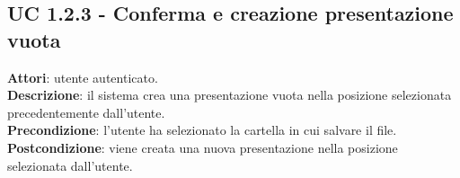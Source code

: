 \subsection{UC 1.2.3 - Conferma e creazione presentazione vuota}{
	\label{uc1.2.3}
	\textbf{Attori}: utente autenticato.	\\
	\textbf{Descrizione}: il sistema crea una presentazione vuota nella posizione selezionata precedentemente dall'utente.	\\
	\textbf{Precondizione}: l'utente ha selezionato la cartella in cui salvare il file.	\\
	\textbf{Postcondizione}: viene creata una nuova presentazione nella posizione selezionata dall'utente.	\\
	}